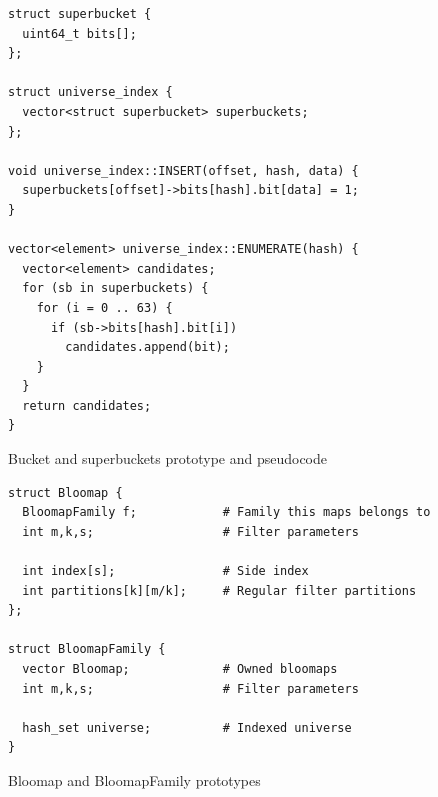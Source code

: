 \begin{figure}[!ht]
\begin{tcolorbox}
\begin{verbatim}
struct superbucket {
  uint64_t bits[];
};

struct universe_index {
  vector<struct superbucket> superbuckets;
};

void universe_index::INSERT(offset, hash, data) {
  superbuckets[offset]->bits[hash].bit[data] = 1;
}

vector<element> universe_index::ENUMERATE(hash) {
  vector<element> candidates;
  for (sb in superbuckets) {
    for (i = 0 .. 63) {
      if (sb->bits[hash].bit[i]) 
        candidates.append(bit);
    }
  }
  return candidates;
}
\end{verbatim}
\end{tcolorbox}
\caption{Bucket and superbuckets prototype and pseudocode}
	\label{figure-bucketshop-pseudocode}
\end{figure}

\begin{figure}[!ht]
\begin{tcolorbox}
\begin{verbatim}
struct Bloomap {
  BloomapFamily f;            # Family this maps belongs to
  int m,k,s;                  # Filter parameters

  int index[s];               # Side index
  int partitions[k][m/k];     # Regular filter partitions
};

struct BloomapFamily {
  vector Bloomap;             # Owned bloomaps
  int m,k,s;                  # Filter parameters

  hash_set universe;          # Indexed universe
}
\end{verbatim}
\end{tcolorbox}
\caption{Bloomap and BloomapFamily prototypes}
\label{figure-bloomap-decl}
\end{figure}

